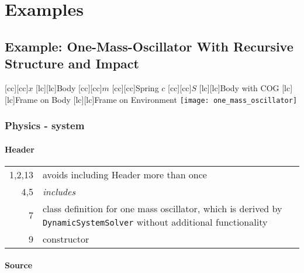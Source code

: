 \section{Examples}

\subsection{Example: One-Mass-Oscillator With Recursive Structure and Impact}

\hspace*{0.2\hsize}
   [cc][cc]{$x$}
   [lc][lc]{Body}
   [cc][cc]{$m$}
   [cc][cc]{Spring $c$}
   [cc][cc]{$S$}
   [lc][lc]{Body with COG}
  [lc][lc]{Frame on Body}
  [lc][lc]{Frame on Environment}
  \texttt{[image: one\_mass\_oscillator]}

\subsubsection{Physics - system}

\paragraph{Header}


\begin{tabular}{r|p{0.85\hsize}}
  1,2,13 & avoids including Header more than once\\
  4,5  & \emph{includes}\\
  7 & class definition for one mass oscillator, which is derived by \texttt{DynamicSystemSolver} without additional functionality\\
  9 & constructor
\end{tabular}

\paragraph{Source}


